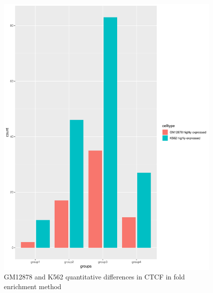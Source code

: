 \documentclass[11pt,letterpaper]{article}
\begin{document}
\begin{figure}[H]
	\begin{center}
		\includegraphics[scale=.3]{FE-CTCF-GM12878-K562.PDF}
		\vspace*{8pt}
		\caption{GM12878 and K562 quantitative differences in CTCF in fold enrichment method}
		\label{fig:go2}
		
	\end{center}
\end{figure}
\end{document}
